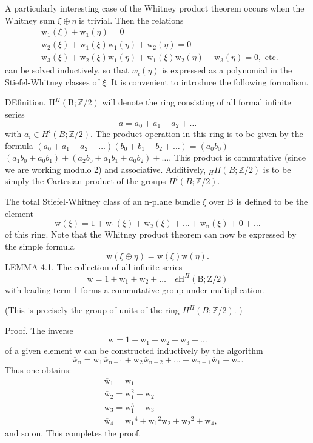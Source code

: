 \documentclass[10pt]{article}
\begin{document}
A particularly interesting case of the Whitney product theorem occurs when the Whitney sum $\xi \oplus \eta$ is trivial. Then the relations
$$
\begin{aligned}
&\mathrm{w}_{1}(\xi)+\mathrm{w}_{1}(\eta)=0 \\
&\mathrm{w}_{2}(\xi)+\mathrm{w}_{1}(\xi) \mathrm{w}_{1}(\eta)+\mathrm{w}_{2}(\eta)=0 \\
&\mathrm{w}_{3}(\xi)+\mathrm{w}_{2}(\xi) \mathrm{w}_{1}(\eta)+\mathrm{w}_{1}(\xi) \mathrm{w}_{2}(\eta)+\mathrm{w}_{3}(\eta)=0, \text { etc. }
\end{aligned}
$$
can be solved inductively, so that $w_{i}(\eta)$ is expressed as a polynomial in the Stiefel-Whitney classes of $\xi$. It is convenient to introduce the following formalism.

DEfinition. $\mathrm{H}^{\Pi}(\mathrm{B} ; \mathbb{Z} / 2)$ will denote the ring consisting of all formal infinite series
$$
a=a_{0}+a_{1}+a_{2}+\ldots
$$
with $a_{i} \in H^{i}(B ; \mathbb{Z} / 2)$. The product operation in this ring is to be given by the formula $\left(a_{0}+a_{1}+a_{2}+\ldots\right)\left(b_{0}+b_{1}+b_{2}+\ldots\right)=\left(a_{0} b_{0}\right)+$ $\left(a_{1} b_{0}+a_{0} b_{1}\right)+\left(a_{2} b_{0}+a_{1} b_{1}+a_{0} b_{2}\right)+\ldots$. This product is commutative (since we are working modulo 2) and associative. Additively, ${ }_{H} \Pi(B ; \mathbb{Z} / 2)$ is to be simply the Cartesian product of the groups $H^{i}(B ; \mathbb{Z} / 2)$.

The total Stiefel-Whitney class of an n-plane bundle $\xi$ over $\mathrm{B}$ is defined to be the element
$$
\mathrm{w}(\xi)=1+\mathrm{w}_{1}(\xi)+\mathrm{w}_{2}(\xi)+\ldots+\mathrm{w}_{\mathrm{n}}(\xi)+0+\ldots
$$
of this ring. Note that the Whitney product theorem can now be expressed by the simple formula
$$
\mathrm{w}(\xi \oplus \eta)=\mathrm{w}(\xi) \mathrm{w}(\eta) .
$$
LEMMA 4.1. The collection of all infinite series
$$
\mathrm{w}=1+\mathrm{w}_{1}+\mathrm{w}_{2}+\ldots \quad \epsilon \mathrm{H}^{\Pi}(\mathrm{B} ; \mathrm{Z} / 2)
$$
with leading term 1 forms a commutative group under multiplication.

(This is precisely the group of units of the ring $H^{\Pi}(B ; \mathbb{Z} / 2) .$ )

Proof. The inverse
$$
\overline{\mathrm{w}}=1+\overline{\mathrm{w}}_{1}+\overline{\mathrm{w}}_{2}+\overline{\mathrm{w}}_{3}+\ldots
$$
of a given element $\mathrm{w}$ can be constructed inductively by the algorithm
$$
\overline{\mathrm{w}}_{\mathrm{n}}=\mathrm{w}_{1} \overline{\mathrm{w}}_{\mathrm{n}-1}+\mathrm{w}_{2} \overline{\mathrm{w}}_{\mathrm{n}-2}+\ldots+\mathrm{w}_{\mathrm{n}-1} \overline{\mathrm{w}}_{1}+\mathrm{w}_{\mathrm{n}} .
$$
Thus one obtains:
$$
\begin{aligned}
&\overline{\mathrm{w}}_{1}=\mathrm{w}_{1} \\
&\overline{\mathrm{w}}_{2}=\mathrm{w}_{1}^{2}+\mathrm{w}_{2} \\
&\overline{\mathrm{w}}_{3}=\mathrm{w}_{1}^{3}+\mathrm{w}_{3} \\
&\overline{\mathrm{w}}_{4}=\mathrm{w}_{1}{ }^{4}+\mathrm{w}_{1}{ }^{2} \mathrm{w}_{2}+\mathrm{w}_{2}{ }^{2}+\mathrm{w}_{4},
\end{aligned}
$$
and so on. This completes the proof.
\end{document}
